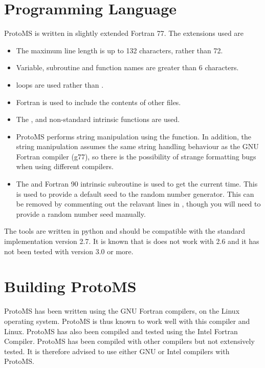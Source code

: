 \documentclass[letterpaper,10pt,english]{sphinxmanual}
\begin{document}
\section{Programming Language}
\label{compilation:fortran77}\label{compilation:programming-language}
ProtoMS is written in slightly extended Fortran 77. The extensions used are
\begin{itemize}
\item {} 
The maximum line length is up to 132 characters, rather than 72.

\item {} 
Variable, subroutine and function names are greater than 6 characters.

\item {} 
 loops are used rather than .

\item {} 
Fortran  is used to include the contents of other files.

\item {} 
The ,  and  non-standard intrinsic functions are used.

\item {} 
ProtoMS performs string manipulation using the  function. In addition, the string manipulation assumes the same string handling behaviour as the GNU Fortran compiler (g77), so there is the possibility of strange formatting bugs when using different compilers.

\item {} 
The  and  Fortran 90 intrinsic subroutine is used to get the current time. This is used to provide a default seed to the random number generator. This can be removed by commenting out the relavant lines in , though you will need to provide a random number seed manually.

\end{itemize}

The tools are written in python and should be compatible with the standard implementation version 2.7. It is known that is does not work with 2.6 and it has not been tested with version 3.0 or more.


\section{Building ProtoMS}
\label{compilation:building-protoms}
ProtoMS has been written using the GNU Fortran compilers, on the Linux operating system. ProtoMS is thus known to work well with this compiler and Linux. ProtoMS has also been compiled and tested using the Intel Fortran Compiler. ProtoMS has been compiled with other compilers but not extensively tested. It is therefore advised to use either GNU or Intel compilers with ProtoMS.
\end{document}

